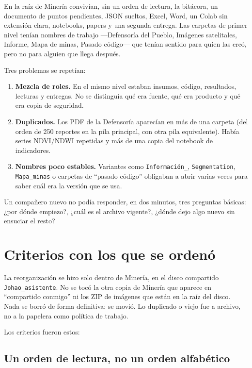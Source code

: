\documentclass[11pt,a4paper]{article}
\begin{document}
En la raíz de Minería convivían, sin un orden de lectura, la bitácora, un documento de puntos pendientes, JSON sueltos, Excel, Word, un Colab sin extensión clara, notebooks, papers y una segunda entrega. Las carpetas de primer nivel tenían nombres de trabajo ---Defensoría del Pueblo, Imágenes satelitales, Informe, Mapa de minas, Pasado código--- que tenían sentido para quien las creó, pero no para alguien que llega después.

Tres problemas se repetían:

\begin{enumerate}
  \item \textbf{Mezcla de roles.} En el mismo nivel estaban insumos, código, resultados, lecturas y entregas. No se distinguía qué era fuente, qué era producto y qué era copia de seguridad.
  \item \textbf{Duplicados.} Los PDF de la Defensoría aparecían en más de una carpeta (del orden de 250 reportes en la pila principal, con otra pila equivalente). Había series NDVI/NDWI repetidas y más de una copia del notebook de indicadores.
  \item \textbf{Nombres poco estables.} Variantes como \texttt{Información\_}, \texttt{Segmentation}, \texttt{Mapa\_minas} o carpetas de ``pasado código'' obligaban a abrir varias veces para saber cuál era la versión que se usa.
\end{enumerate}

Un compañero nuevo no podía responder, en dos minutos, tres preguntas básicas: ¿por dónde empiezo?, ¿cuál es el archivo vigente?, ¿dónde dejo algo nuevo sin ensuciar el resto?

\section{Criterios con los que se ordenó}

La reorganización se hizo solo dentro de Minería, en el disco compartido \texttt{Johao\_asistente}. No se tocó la otra copia de Minería que aparece en ``compartido conmigo'' ni los ZIP de imágenes que están en la raíz del disco. Nada se borró de forma definitiva: se movió. Lo duplicado o viejo fue a archivo, no a la papelera como política de trabajo.

Los criterios fueron estos:

\subsection{Un orden de lectura, no un orden alfabético}
\end{document}
